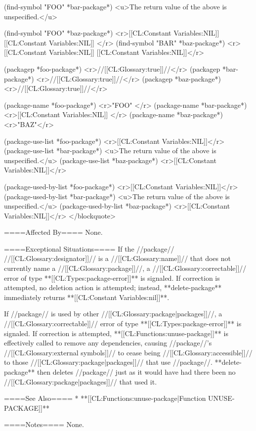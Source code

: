 (find-symbol "FOO" *bar-package*) <u>The return value of the above is unspecified.</u>

(find-symbol "FOO" *baz-package*) <r>[[CL:Constant Variables:NIL]]
[[CL:Constant Variables:NIL]] </r>
(find-symbol "BAR" *baz-package*) <r>[[CL:Constant Variables:NIL]]
[[CL:Constant Variables:NIL]]</r>

(packagep *foo-package*) <r>//[[CL:Glossary:true]]//</r>
(packagep *bar-package*) <r>//[[CL:Glossary:true]]//</r>
(packagep *baz-package*) <r>//[[CL:Glossary:true]]//</r>

(package-name *foo-package*) <r>"FOO" </r>
(package-name *bar-package*) <r>[[CL:Constant Variables:NIL]] </r>
(package-name *baz-package*) <r>"BAZ"</r>

(package-use-list *foo-package*) <r>[[CL:Constant Variables:NIL]]</r>
(package-use-list *bar-package*) <u>The return value of the above is unspecified.</u>
(package-use-list *baz-package*) <r>[[CL:Constant Variables:NIL]]</r>

(package-used-by-list *foo-package*) <r>[[CL:Constant Variables:NIL]]</r>
(package-used-by-list *bar-package*) <u>The return value of the above is unspecified.</u>
(package-used-by-list *baz-package*) <r>[[CL:Constant Variables:NIL]]</r>
</blockquote>

====Affected By====
None.

====Exceptional Situations====
If the //package// //[[CL:Glossary:designator]]// is a //[[CL:Glossary:name]]// that does not currently name a //[[CL:Glossary:package]]//, a //[[CL:Glossary:correctable]]// error of type **[[CL:Types:package-error]]** is signaled. If correction is attempted, no deletion action is attempted; instead, **delete-package** immediately returns **[[CL:Constant Variables:nil]]**.

If //package// is used by other //[[CL:Glossary:package|packages]]//, a //[[CL:Glossary:correctable]]// error of type **[[CL:Types:package-error]]** is signaled. If correction is attempted, **[[CL:Functions:unuse-package]]** is effectively called to remove any dependencies, causing //package//'s //[[CL:Glossary:external symbols]]// to cease being //[[CL:Glossary:accessible]]// to those //[[CL:Glossary:package|packages]]// that use //package//. **delete-package** then deletes //package// just as it would have had there been no //[[CL:Glossary:package|packages]]// that used it.

====See Also====
  * **[[CL:Functions:unuse-package|Function UNUSE-PACKAGE]]**

====Notes====
None.

 
